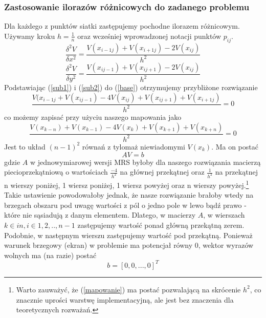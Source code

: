 \documentclass{article}
\begin{document}
\subsubsection{Zastosowanie ilorazów różnicowych do zadanego problemu}
Dla każdego z punktów siatki zastępujemy pochodne ilorazem różnicowym. Używamy kroku $h=\frac{1}{n} $ oraz
wcześniej wprowadzonej notacji punktów $p_{ij}$.
\begin{equation}
	\frac{\delta^2 V}{\delta x^2}=\frac{V(x_{i-1j})+V(x_{i+1j})-2V(x_{ij})}{h^2}
	\label{sub1}
\end{equation}
\begin{equation}
	\frac{\delta^2 V}{\delta y^2}=\frac{V(x_{ij-1})+V(x_{ij+1})-2V(x_{ij})}{h^2}
	\label{sub2}
\end{equation}
Podstawiając (\ref{sub1}) i (\ref{sub2}) do (\ref{base}) otrzymujemy przybliżone rozwiązanie
\begin{equation}
	\frac{V(x_{i-1j}+V(x_{ij-1})-4V(x_{ij})+V(x_{ij+1})+V(x_{i+1j})}{h^2} = 0
\end{equation}
co możemy zapisać przy użyciu naszego mapowania jako
\begin{equation}
	\frac{V(x_{k-n})+V(x_{k-1})-4V(x_{k})+V(x_{k+1})+V(x_{k+n})}{h^2} = 0 
	\label{mapowanie}
\end{equation}
Jest to układ $(n-1)^2$ równań z tylomaż niewiadomymi $V(x_{k})$. Ma on postać
\begin{equation}
	AV=b
	\label{uklad}
\end{equation}
gdzie $A$ w jednowymiarowej wersji MRS byłoby dla naszego rozwiązania macierzą piecioprzekątniową
o wartościach $\frac{-4}{h^2}$ na głównej przekątnej oraz $\frac{1}{h^2}$ na przekątnej n wierszy poniżej,
1 wiersz poniżej, 1 wiersz powyżej oraz n wierszy powyżej.\footnote{Warto zauważyć, że (\ref{mapowanie})
ma postać pozwalającą na skrócenie $h^2$, co znacznie uprości warstwę implementacyjną, ale jest bez znaczenia dla
teoretycznych rozważań.}
Takie ustawienie powodowałoby jednak, że nasze rozwiązanie brałoby wtedy na brzegach obszaru pod uwagę wartości z
pól o jedno pole w lewo bądź prawo - które nie sąsiadują z danym elementem. Dlatego, w macierzy $A$, w wierszach
$k\in in, i\in {1,2,..,n-1}$ zastępujemy wartość ponad główną przekątną zerem. Podobnie, w następnym wierszu zastępujemy
wartość pod przekątną. Ponieważ warunek brzegowy (ekran) w problemie ma potencjał równy 0, wektor wyrazów wolnych ma (na razie) postać
\begin{equation*}
b=[0,0,...,0]^T
\end{equation*}
\end{document}
